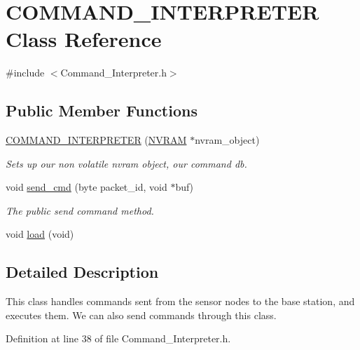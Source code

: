 \hypertarget{class_c_o_m_m_a_n_d___i_n_t_e_r_p_r_e_t_e_r}{\section{C\-O\-M\-M\-A\-N\-D\-\_\-\-I\-N\-T\-E\-R\-P\-R\-E\-T\-E\-R Class Reference}
\label{class_c_o_m_m_a_n_d___i_n_t_e_r_p_r_e_t_e_r}
}


{\ttfamily \#include $<$Command\-\_\-\-Interpreter.\-h$>$}

\subsection*{Public Member Functions}
\begin{DoxyCompactItemize}
\item 
\hyperlink{class_c_o_m_m_a_n_d___i_n_t_e_r_p_r_e_t_e_r_acf72647f09e8725ccc8d3d30c647fffc}{C\-O\-M\-M\-A\-N\-D\-\_\-\-I\-N\-T\-E\-R\-P\-R\-E\-T\-E\-R} (\hyperlink{class_n_v_r_a_m}{N\-V\-R\-A\-M} $\ast$nvram\-\_\-object)
\begin{DoxyCompactList}\small\item\em Sets up our non volatile nvram object, our command db. \end{DoxyCompactList}\item 
void \hyperlink{class_c_o_m_m_a_n_d___i_n_t_e_r_p_r_e_t_e_r_a318e956998fca2e35ecafd435083da02}{send\-\_\-cmd} (byte packet\-\_\-id, void $\ast$buf)
\begin{DoxyCompactList}\small\item\em The public send command method. \end{DoxyCompactList}\item 
void \hyperlink{class_c_o_m_m_a_n_d___i_n_t_e_r_p_r_e_t_e_r_a8ebcb951b43ddb0b6d64bd0a30ab0362}{load} (void)
\end{DoxyCompactItemize}


\subsection{Detailed Description}
This class handles commands sent from the sensor nodes to the base station, and executes them. We can also send commands through this class. 

Definition at line 38 of file Command\-\_\-\-Interpreter.\-h.



